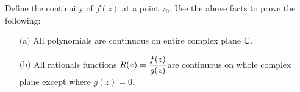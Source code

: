 \documentclass[11pt,addpoints,answers]{exam}
\begin{document}
\begin{questions}
\question  Define the continuity of $f(z)$ at a point $z_0$. Use the above facts to prove the following:
\begin{enumerate} 
\item [$($\rm a$)$] All polynomials  are continuous on entire complex plane  $\mathbb{C}$.
\item [$($\rm b$)$] All rationals functions $R(z)=\mathlarger{\frac{f(z)}{g(z)}}$are continuous on whole complex plane except where $g(z)=0$.
\end{enumerate} 

\end{questions}
\end{document}
